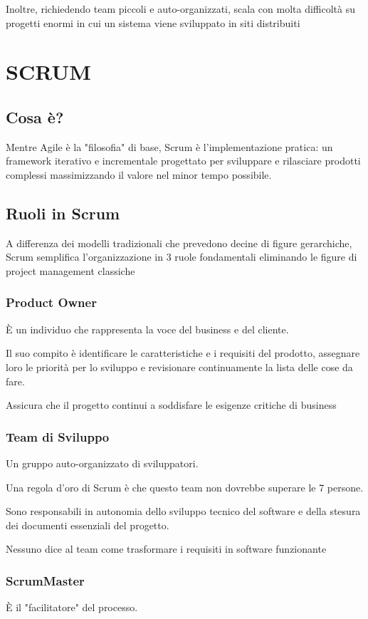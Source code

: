 Inoltre, richiedendo team piccoli e auto-organizzati, scala con molta difficoltà su progetti enormi in cui un sistema viene sviluppato in siti distribuiti

\chapter{SCRUM}
\section{Cosa è?}
Mentre Agile è la "filosofia" di base, Scrum è l'implementazione pratica: un framework iterativo e incrementale progettato per sviluppare e rilasciare prodotti complessi massimizzando il valore nel minor tempo possibile.

\section{Ruoli in Scrum}
A differenza dei modelli tradizionali che prevedono decine di figure gerarchiche, Scrum semplifica l'organizzazione in 3 ruole fondamentali eliminando le figure di project management classiche

\subsection{Product Owner}
È un individuo che rappresenta la voce del business e del cliente.

Il suo compito è identificare le caratteristiche e i requisiti del prodotto, assegnare loro le priorità per lo sviluppo e revisionare continuamente la lista delle cose da fare.

Assicura che il progetto continui a soddisfare le esigenze critiche di business

\subsection{Team di Sviluppo}
Un gruppo auto-organizzato di sviluppatori.

Una regola d'oro di Scrum è che questo team non dovrebbe superare le 7 persone.

Sono responsabili in autonomia dello sviluppo tecnico del software e della stesura dei documenti essenziali del progetto.

Nessuno dice al team come trasformare i requisiti in software funzionante

\subsection{ScrumMaster}
È il "facilitatore" del processo.

